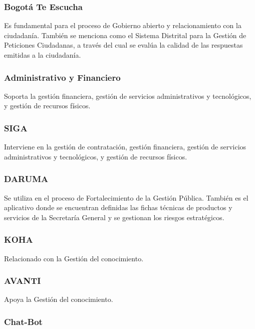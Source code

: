 \documentclass[
	a4paper, %
	12pt, %
]{include/CSSullivanBusinessReport}
\begin{document}
\subsubsection{Bogotá Te Escucha}\label{sec:bogotuxe1-te-escucha}

Es fundamental para el proceso de Gobierno abierto y relacionamiento con
la ciudadanía. También se menciona como el Sistema Distrital para la
Gestión de Peticiones Ciudadanas, a través del cual se evalúa la calidad
de las respuestas emitidas a la ciudadanía.

\subsubsection{Administrativo y
Financiero}\label{sec:administrativo-y-financiero}

Soporta la gestión financiera, gestión de servicios administrativos y
tecnológicos, y gestión de recursos físicos.

\subsubsection{SIGA}\label{sec:siga}

Interviene en la gestión de contratación, gestión financiera, gestión de
servicios administrativos y tecnológicos, y gestión de recursos físicos.

\subsubsection{DARUMA}\label{sec:daruma}

Se utiliza en el proceso de Fortalecimiento de la Gestión Pública.
También es el aplicativo donde se encuentran definidas las fichas
técnicas de productos y servicios de la Secretaría General y se
gestionan los riesgos estratégicos.

\subsubsection{KOHA}\label{sec:koha}

Relacionado con la Gestión del conocimiento.

\subsubsection{AVANTI}\label{sec:avanti}

Apoya la Gestión del conocimiento.

\subsubsection{Chat-Bot}\label{sec:chat-bot}
\end{document}
